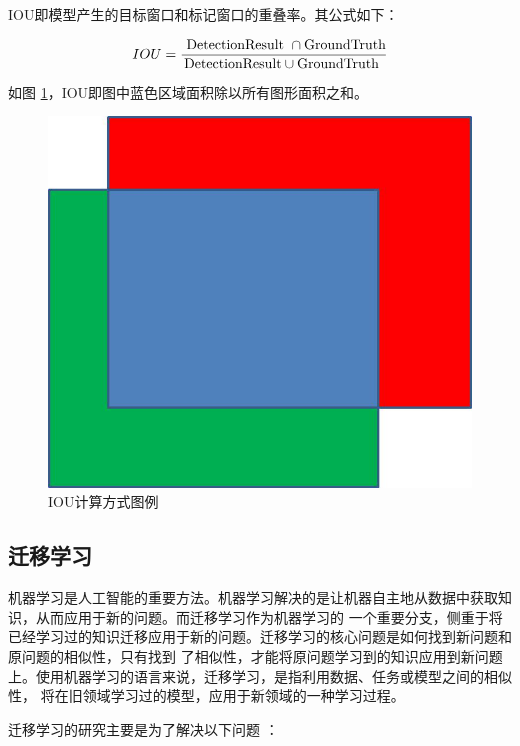 IOU即模型产生的目标窗口和标记窗口的重叠率。其公式如下：

\begin{equation}
    \centering
    I O U = \frac { \text { DetectionResult } \cap \text {GroundTruth} } { \text {DetectionResult} \cup \text {GroundTruth } }
    \label{IOU_equation}
\end{equation}

如图 \ref{fig:IOU_equation}，IOU即图中蓝色区域面积除以所有图形面积之和。

\begin{figure}[htbp]
    \centering
    \includegraphics[scale=0.8]{pic/chap3/IOU.jpg}
    \caption{IOU计算方式图例}
    \label{fig:IOU_equation}
\end{figure}

\subsection{迁移学习}
机器学习是人工智能的重要方法。机器学习解决的是让机器自主地从数据中获取知识，从而应用于新的问题。而迁移学习作为机器学习的
一个重要分支，侧重于将已经学习过的知识迁移应用于新的问题。迁移学习的核心问题是如何找到新问题和原问题的相似性，只有找到
了相似性，才能将原问题学习到的知识应用到新问题上。使用机器学习的语言来说，迁移学习，是指利用数据、任务或模型之间的相似性，
将在旧领域学习过的模型，应用于新领域的一种学习过程。

迁移学习的研究主要是为了解决以下问题 \cite{TL_tutorial}：
 
